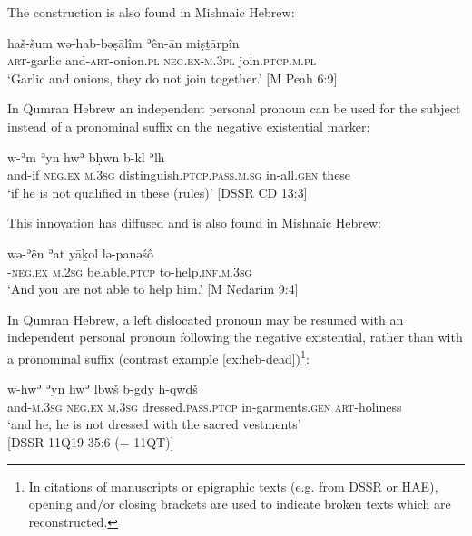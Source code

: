 \documentclass[output=paper,colorlinks,citecolor=brown,draft,draftmode]{langscibook}
\begin{document}
%
The construction is also found in Mishnaic Hebrew:
%
\begin{exe}\ex \label{ex:heb-garlic}
    \gll haš-šum wə-hab-bəṣālîm ʾên-ān    miṣṯārp̱în \\
  \textsc{art}-garlic   and-\textsc{art}-onion.\textsc{pl} \textsc{neg.ex-m.3pl}  
join.\textsc{ptcp.m.pl} \\
    \glt `Garlic and onions, they do not join together.'
    [M Peah 6:9]
    \end{exe}
%
In Qumran Hebrew an independent personal pronoun can be used for the subject instead of a pronominal suffix on the negative existential marker:
%
\begin{exe}\ex \label{ex:heb-qualified}
    \gll w-ʾm  ʾyn  hwʾ  bḥwn        b-kl ʾlh \\
    and-if    \textsc{neg.ex} \textsc{m.3sg} distinguish.\textsc{ptcp.pass.m.sg}
    in-all.\textsc{gen}  these\\
    \glt `if he is not qualified in these (rules)' [DSSR CD
13:3]
    \end{exe}
%
This innovation has diffused and is also found in Mishnaic Hebrew:
%
\begin{exe}\ex \label{ex:heb-unable-to-help}
    \gll {\ob}wə{\cb}-ʾên ʾat yāḵol lə-panəśô \\
[and]-\textsc{neg.ex} \textsc{m.2sg} be.able.\textsc{ptcp}
to-help.\textsc{inf.m.3sg} \\
    \glt `And you are not able to help him.' [M Nedarim
9:4]
    \end{exe}
%
In Qumran Hebrew, a left dislocated pronoun may be resumed with an
independent personal pronoun following the negative existential, rather
than with a pronominal suffix (contrast example
\ref{ex:heb-dead})\footnote{In citations of manuscripts or epigraphic texts (e.g. from DSSR or HAE), opening and/or closing brackets are used to indicate broken texts which are reconstructed.}:
%
\begin{exe}\ex \label{ex:heb-dressed}
    \gll w-hwʾ ʾyn hwʾ lbwš b-g{\ob}dy h-qwdš     
    \\ and-\textsc{m.3sg} \textsc{neg.ex} \textsc{m.3sg}
    dressed.\textsc{pass.ptcp}  in-garments.\textsc{gen}
    \textsc{art}-holiness\\
    \glt `and he, he is not dressed with the sacred vestments'\\
          [DSSR 11Q19 35:6 (= 11QT)]
    \end{exe}
\end{document}
